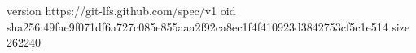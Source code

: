 version https://git-lfs.github.com/spec/v1
oid sha256:49fae9f071df6a727c085e855aaa2f92ca8ec1f4f410923d3842753cf5c1e514
size 262240
